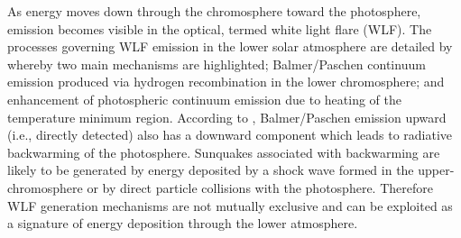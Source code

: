 As energy moves down through the chromosphere toward the photosphere, emission becomes visible in the optical, termed white light flare (WLF). The processes governing WLF emission in the lower solar atmosphere are detailed by \cite{2007ASPC..368..417D} whereby two main mechanisms are highlighted; Balmer/Paschen continuum emission produced via hydrogen recombination in the lower chromosphere; and enhancement of photospheric continuum emission due to heating of the temperature minimum region. According to \cite{1989SoPh..124..303M}, Balmer/Paschen emission upward (i.e., directly detected) also has a downward component which leads to radiative backwarming of the photosphere. Sunquakes associated with backwarming are likely to be generated by energy deposited by a shock wave formed in the upper-chromosphere or by direct particle collisions with the photosphere. Therefore WLF generation mechanisms are not mutually exclusive and can be exploited as a signature of energy deposition through the lower atmosphere.  



